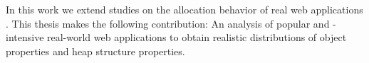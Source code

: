 In this work we extend studies on the allocation behavior of real \JS web
applications \cite{JSMeter2009}. This thesis makes the following contribution:
An analysis of popular and \JS-intensive real-world web applications to obtain
realistic distributions of object properties and heap structure properties.


% 
% 
% 

% 
